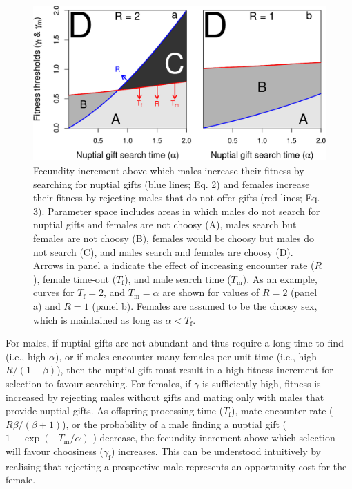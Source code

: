 \documentclass[
]{article}
\begin{document}
\begin{figure}
\centering
\includegraphics{ms_files/figure-latex/unnamed-chunk-3-1.pdf}
\caption{Fecundity increment above which males increase their fitness by
searching for nuptial gifts (blue lines; Eq. 2) and females increase
their fitness by rejecting males that do not offer gifts (red lines; Eq.
3). Parameter space includes areas in which males do not search for
nuptial gifts and females are not choosy (A), males search but females
are not choosy (B), females would be choosy but males do not search (C),
and males search and females are choosy (D). Arrows in panel a indicate
the effect of increasing encounter rate (\(R\)), female time-out
(\(T_{\mathrm{f}}\)), and male search time (\(T_{\mathrm{m}}\)). As an
example, curves for \(T_{\mathrm{f}} = 2\), and
\(T_{\mathrm{m}} = \alpha\) are shown for values of \(R=2\) (panel a)
and \(R = 1\) (panel b). Females are assumed to be the choosy sex, which
is maintained as long as \(\alpha < T_{\mathrm{f}}\).}
\end{figure}

For males, if nuptial gifts are not abundant and thus require a long
time to find (i.e., high \(\alpha\)), or if males encounter many females
per unit time (i.e., high \(R / (1+\beta)\)), then the nuptial gift must
result in a high fitness increment for selection to favour searching.
For females, if \(\gamma\) is sufficiently high, fitness is increased by
rejecting males without gifts and mating only with males that provide
nuptial gifts. As offspring processing time (\(T_{\mathrm{f}}\)), mate
encounter rate (\(R\beta / (\beta + 1)\)), or the probability of a male
finding a nuptial gift (\(1 - \exp(-T_{\mathrm{m}}/\alpha)\) ) decrease,
the fecundity increment above which selection will favour choosiness
(\(\gamma_{\mathrm{f}}\)) increases. This can be understood intuitively
by realising that rejecting a prospective male represents an opportunity
cost for the female.
\end{document}
